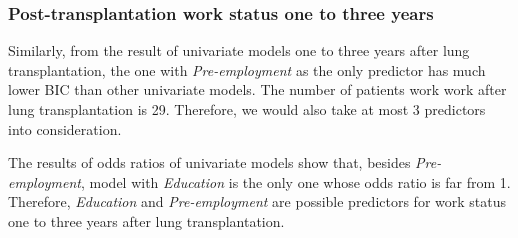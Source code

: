 \documentclass[11pt, a4paper]{article}\usepackage[]{graphicx}\usepackage[]{color}
\begin{document}
{\subsubsection*{Post-transplantation work status one to three years} \label{subsubsec:logis2}

\begin{table}[ht]
\centering
\caption{Univariate models for work status one to three years after LTx} 
\end{table}



Similarly, from the result of univariate models one to three years after lung transplantation, the one with \textit{Pre-employment} as the only predictor has much lower BIC than other univariate models. The number of patients work work after lung transplantation is 29. Therefore, we would also take at most 3 predictors into consideration.

The results of odds ratios of univariate models show that, besides \textit{Pre-employment}, model with \textit{Education} is the only one whose odds ratio is far from 1. Therefore, \textit{Education} and \textit{Pre-employment} are possible predictors for work status one to three years after lung transplantation.


}
\end{document}
